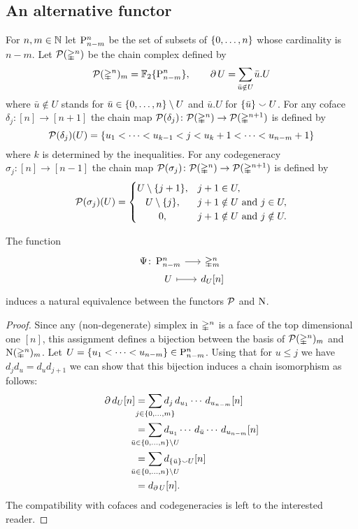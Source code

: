 \subsection{An alternative functor}\label{ss:equivalence_of_functors}

For $n,m \in \N$ let $\P_{n-m}^n$ be the set of subsets of $\set{0,\dots,n}$ whose cardinality is $n-m$.
Let $\cP(\simplex^n)$ be the chain complex defined by
\[
\cP(\simplex^n)_m = \Ftwo\set{\P_{n-m}^n}, \qquad
\bd U = \sum_{\mathclap{\bar{u} \notin U}} \bar{u}.U
\]
where $\bar{u} \notin U$ stands for $\bar{u} \in \set{0,\dots,n} \setminus U$ and $\bar{u}.U$ for $\set{\bar{u}} \union U$.
For any coface $\delta_j \colon [n] \to [n+1]$ the chain map $\cP(\delta_j) \colon \cP(\simplex^n) \to \cP(\simplex^{n+1})$ is defined by
\[
\cP(\delta_j)(U) = \set{u_1 < \dots < u_{k-1} < j < u_k+1 < \dots < u_{n-m}+1}
\]
where $k$ is determined by the inequalities.
For any codegeneracy $\sigma_j \colon [n] \to [n-1]$ the chain map $\cP(\sigma_j) \colon \cP(\simplex^n) \to \cP(\simplex^{n+1})$ is defined by
\begin{equation}\label{eq:codegeneracies}
	\cP(\sigma_j)(U) =
	\begin{cases}
		U \setminus \{j+1\}, & j+1 \in U, \\
		\hfil U \setminus \{j\}, & j+1 \notin U \text{ and } j \in U, \\
		\hfil 0, & j+1 \notin U \text{ and } j \notin U.
	\end{cases}
\end{equation}

\begin{lemma}
	The function
	\[
	\begin{tikzcd}[column sep=small,row sep=0]
		\Psi \colon &[-19] \P_{n-m}^n \rar & \simplex^n_m \\
		& U \rar[mapsto] & d_U [n]
	\end{tikzcd}
	\]
	induces a natural equivalence between the functors $\cP$ and $\chains$.
\end{lemma}

\begin{proof}
	Since any (non-degenerate) simplex in $\simplex^n$ is a face of the top dimensional one $[n]$, this assignment defines a bijection between the basis of $\cP(\simplex^n)_m$ and $\chains(\simplex^n)_m$.
	Let $U = \{u_1 < \cdots < u_{n-m}\} \in \rP_{n-m}^n$.
	Using that for $u \leq j$ we have $d_jd_u = d_ud_{j+1}$ we can show that this bijection induces a chain isomorphism as follows:
	\begin{align*}
		\bd d_U[n] &=
		\sum_{\mathclap{j \in \{0, \dots, m\}}}
		d_j\, d_{u_1} \cdots\, d_{u_{n-m}}[n] \\ &=
		\sum_{\mathclap{\bar u \in \{0, \dots, n\} \setminus U}}
		d_{u_1} \cdots\, d_{\bar{u}} \cdots\, d_{u_{n-m}}[n] \\ &=
		\sum_{\mathclap{\bar u \in \{0, \dots, n\} \setminus U}}
		d_{\{\bar u\} \union U}[n] \\ &=
		d_{\bd U}[n].
	\end{align*}
	The compatibility with cofaces and codegeneracies is left to the interested reader.
\end{proof}

